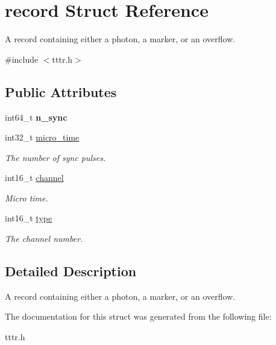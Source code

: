 \hypertarget{structrecord}{}\section{record Struct Reference}
\label{structrecord}


A record containing either a photon, a marker, or an overflow.  




{\ttfamily \#include $<$tttr.\+h$>$}

\subsection*{Public Attributes}
\begin{DoxyCompactItemize}
\item 
\mbox{\label{structrecord_a68c5e280ab564f2b381aa46ab9042f56}} 
int64\+\_\+t {\bfseries n\+\_\+sync}
\item 
\mbox{\label{structrecord_a560f6bf53d7391bc0913e86b0afd0050}} 
int32\+\_\+t \hyperlink{structrecord_a560f6bf53d7391bc0913e86b0afd0050}{micro\+\_\+time}
\begin{DoxyCompactList}\small\item\em The number of sync pulses. \end{DoxyCompactList}\item 
\mbox{\label{structrecord_aa00c54d4069198c49b7392208ffa5557}} 
int16\+\_\+t \hyperlink{structrecord_aa00c54d4069198c49b7392208ffa5557}{channel}
\begin{DoxyCompactList}\small\item\em Micro time. \end{DoxyCompactList}\item 
\mbox{\label{structrecord_a0795a4b9a10dff80dd3612627d19850a}} 
int16\+\_\+t \hyperlink{structrecord_a0795a4b9a10dff80dd3612627d19850a}{type}
\begin{DoxyCompactList}\small\item\em The channel number. \end{DoxyCompactList}\end{DoxyCompactItemize}


\subsection{Detailed Description}
A record containing either a photon, a marker, or an overflow. 

The documentation for this struct was generated from the following file\+:\begin{DoxyCompactItemize}
\item 
tttr.\+h\end{DoxyCompactItemize}

